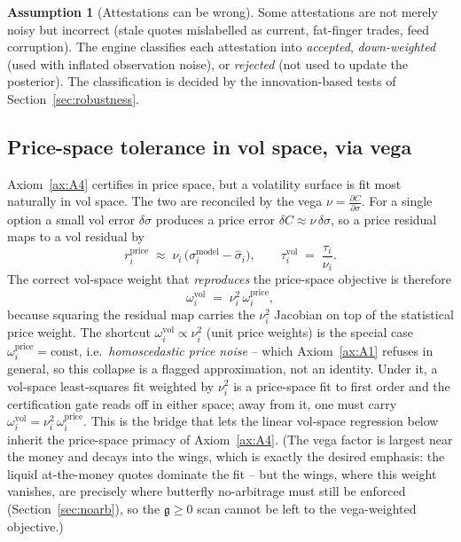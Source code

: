 \documentclass[11pt]{book}
\theoremstyle{plain}
\theoremstyle{definition}
\newtheorem{assumption}[theorem]{Assumption}
\theoremstyle{remark}
\newcommand{\gDurr}{\mathfrak{g}}                %
\newcommand{\vega}{\nu}                          %
\newcommand{\pd}[2]{\frac{\partial #1}{\partial #2}}          %
\begin{document}
\begin{assumption}[Attestations can be wrong]
\label{ax:A7}
Some attestations are not merely noisy but incorrect (stale quotes mislabelled as
current, fat-finger trades, feed corruption). The engine classifies each
attestation into \emph{accepted}, \emph{down-weighted} (used with inflated
observation noise), or \emph{rejected} (not used to update the posterior). The
classification is decided by the innovation-based tests of
Section~\ref{sec:robustness}.
\end{assumption}

\subsection{Price-space tolerance in vol space, via vega}

Axiom~\ref{ax:A4} certifies in price space, but a volatility surface is fit most
naturally in vol space. The two are reconciled by the vega $\vega=\pd{C}{\sigma}$.
For a single option a small vol error $\delta\sigma$ produces a price error
$\delta C \approx \vega\,\delta\sigma$, so a price residual maps to a vol residual
by
\[
    r_i^{\text{price}} \;\approx\; \vega_i\,\bigl(\sigma_i^{\text{model}}
    - \hat\sigma_i\bigr),
    \qquad
    \tau_i^{\text{vol}} \;=\; \frac{\tau_i}{\vega_i} .
\]
The correct vol-space weight that \emph{reproduces} the price-space objective is
therefore
\[
    \omega_i^{\text{vol}} \;=\; \vega_i^2\,\omega_i^{\text{price}} ,
\]
because squaring the residual map carries the $\vega_i^2$ Jacobian on top of the
statistical price weight. The shortcut
$\omega_i^{\text{vol}}\propto\vega_i^2$ (unit price weights) is the special case
$\omega_i^{\text{price}}=\text{const}$, i.e.\ \emph{homoscedastic price noise} --
which Axiom~\ref{ax:A1} refuses in general, so this collapse is a
flagged approximation, not an identity. Under it, a vol-space least-squares fit
weighted by $\vega_i^2$ is a price-space fit to first order and the certification
gate reads off in either space; away from it, one must carry
$\omega_i^{\text{vol}}=\vega_i^2\,\omega_i^{\text{price}}$. This is the bridge
that lets the linear vol-space regression below inherit the price-space primacy of
Axiom~\ref{ax:A4}. (The vega factor is largest near the money and decays into the
wings, which is exactly the desired emphasis: the liquid at-the-money quotes
dominate the fit -- but the wings, where this weight
vanishes, are precisely where butterfly no-arbitrage must still be enforced
(Section~\ref{sec:noarb}), so
the $\gDurr\ge0$ scan cannot be left to the vega-weighted objective.)
\end{document}
